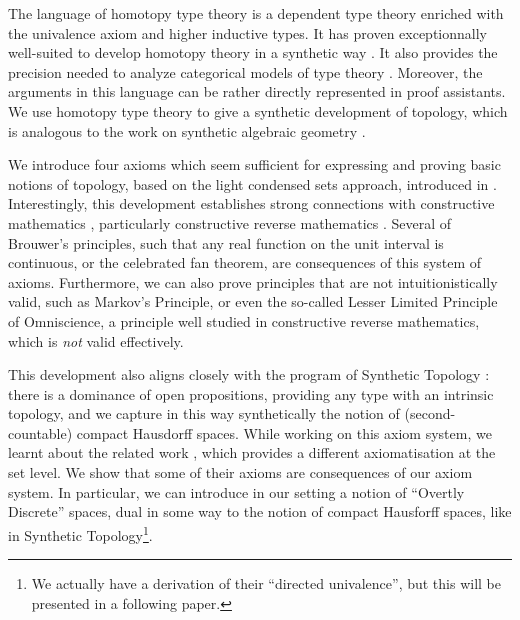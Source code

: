 The language of homotopy type theory is a  dependent type theory enriched with the univalence axiom and higher inductive types. It has proven exceptionnally well-suited to
develop homotopy theory in a synthetic way \cite{hott}. It also provides
the precision needed to analyze categorical models of type theory \cite{vanderweide2024}.
Moreover, the arguments in this language can be rather directly represented in proof assistants. We use homotopy type theory to give a synthetic development of topology, which is analogous to the work on synthetic algebraic geometry \cite{draft}. 

We introduce 
four axioms which seem sufficient for expressing and proving basic notions of topology, based on the light condensed
sets approach, introduced in \cite{Scholze}.
Interestingly, this development establishes strong connections with constructive mathematics \cite{Bishop},
particularly constructive reverse mathematics \cite{ReverseMathsBishop,HannesDiener}. Several of Brouwer's principles, such that
any real function on the unit interval is continuous, or the celebrated fan theorem, are consequences of this system
of axioms. Furthermore, we can also prove principles that are not intuitionistically valid, such as Markov's Principle,
or even the so-called Lesser Limited Principle of Omniscience, a principle well studied in constructive reverse mathematics,
which is {\em not} valid effectively.

This development also aligns closely with the program of Synthetic
Topology \cite{SyntheticTopologyEscardo,SyntheticTopologyLesnik,abstractstone}:
there is a dominance of open propositions, providing any type with an intrinsic
topology, and we capture in this way synthetically the notion of (second-countable) compact Hausdorff spaces.
While working on this axiom system, we learnt about the related work \cite{bc24}, which provides a different axiomatisation
at the set level. We show that some of their axioms are consequences of our axiom system. In particular, we can introduce
in our setting a notion of ``Overtly Discrete'' spaces, dual in some way to the notion of compact Hausforff spaces, like
in Synthetic Topology\footnote{We actually have a
derivation of their ``directed univalence'', but this will be presented in a following paper.}.

